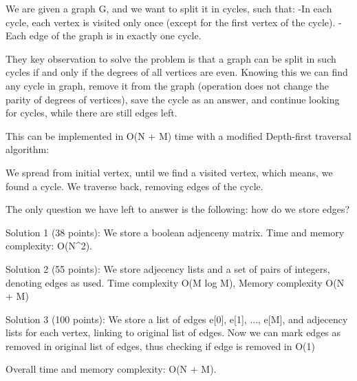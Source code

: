 
We are given a graph G, and we want to split it in cycles, such that:
 -In each cycle, each vertex is visited only once (except for the first vertex of the cycle).
 -Each edge of the graph is in exactly one cycle. 

They key observation to solve the problem is that a graph can be split in such cycles if and only if
the degrees of all vertices are even. Knowing this we can find any cycle in graph, remove it from the graph
(operation does not change the parity of degrees of vertices), save the cycle as an answer, and continue
looking for cycles, while there are still edges left. 

This can be implemented in O(N + M) time with a modified Depth-first traversal algorithm:

We spread from initial vertex, until we find a visited vertex, which means, we found a cycle. We
traverse back, removing edges of the cycle. 

The only question we have left to answer is the following: how do we store edges?

Solution 1 (38 points):
We store a boolean adjenceny matrix.
Time and memory complexity: O(N^2).

Solution 2 (55 points):
We store adjecency lists and a set of pairs of integers, denoting edges as used. 
Time complexity O(M log M), Memory complexity O(N + M)

Solution 3 (100 points):
We store a list of edges e[0], e[1], ..., e[M], and adjecency lists for each vertex, 
linking to original list of edges. Now we can mark edges as removed in original list
of edges, thus checking if edge is removed in O(1)

Overall time and memory complexity: O(N + M).

